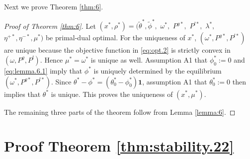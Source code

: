 Next we prove Theorem \ref{thm:6}.
\begin{proof}[Proof of Theorem \ref{thm:6}]
	Let $(x^*, \rho^*) = (\tilde{\theta}^*$$, \tilde \phi^*,$ $
	\omega^*,$ $ P^{g*},$ $ P^{l*},$ $\lambda^*,$$ \eta^{+*},
	\eta^{-*}, \mu^*)$
	be primal-dual optimal. 
%	
%	
%	
%	
%	
%	
	For the uniqueness of $x^*$, $(\omega^*, P^{g*}, P^{l*})$ are unique because
	the objective function in \eqref{eq:opt.2} is strictly convex in $(\omega, P^{g}, P^{l})$.
	Hence $\mu^*= \omega^*$ is unique as well.
	Assumption A1 that $\phi^*_0:=0$ and \eqref{eq:lemma.6.1} imply that $\phi^*$ is 
	uniquely determined by the equilibrium $(\omega^*, P^{g*}, P^{l*})$.  
	Since $\theta^* - \phi^* = (\theta^*_0-\phi^*_0)\textbf{1}$, assumption A1 that 
	$\theta^*_0:=0$ then implies that $\theta^*$ is unique.
	This proves the uniqueness of $(x^*, \mu^*)$.
	
	The remaining three parts of the theorem follow from Lemma \ref{lemma:6}.
\end{proof}



\section{Proof Theorem \ref{thm:stability.22}}
\label{appd.thm8}
\renewcommand{\theequation}{B.\arabic{equation}}
\renewcommand{\thetheorem}{B.\arabic{theorem}}

